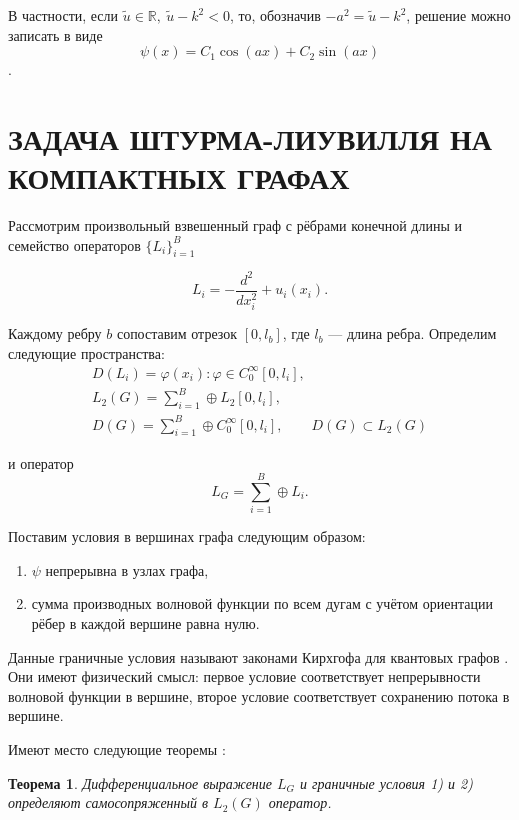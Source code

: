 \documentclass[a4 paper, 12 pt]{extarticle}
\newtheorem{theorem}{Теорема}[section]
\begin{document}
   В частности, если $\tilde{u} \in \mathbb{R}, \ \tilde{u}-k^2<0$, то, обозначив $-a^2=\tilde{u}-k^2$, решение можно записать в виде \[\psi\left(x\right)= C_1 \cos\left(ax\right)+ C_2 \sin\left(ax\right)\].
   
   \section{ЗАДАЧА ШТУРМА-ЛИУВИЛЛЯ НА КОМПАКТНЫХ ГРАФАХ}

   Рассмотрим произвольный взвешенный граф с рёбрами конечной длины и семейство операторов $\{L_i\}_{i=1}^B$

   \begin{equation}\label{LOp}
   L_i = -\frac{d^2}{dx_i^2} + u_i(x_i).
   \end{equation}

   Каждому ребру $b$ сопоставим отрезок $[0, l_b]$, где $l_b$ --- длина ребра.
   Определим следующие пространства:
   \begin{gather*}
   D(L_i)={\varphi(x_i):\varphi\in C_0^\infty[0,l_i]},\\
   L_2(G)=\sum_{i=1}^{B}\oplus L_2[0, l_i],\\
   D(G)=\sum_{i=1}^{B}\oplus C_0^\infty[0,l_i],\qquad D(G)\subset L_2(G)
  \end{gather*}

  и оператор
  \begin{equation}\label{LG}
  L_G=\sum_{i=1}^{B}\oplus L_i.
  \end{equation}

  Поставим условия в вершинах графа следующим образом:

  \begin{enumerate}\label{Kirchoff}
	\item $\psi$ непрерывна в узлах графа,
	\item сумма производных волновой функции по всем дугам с учётом ориентации рёбер в каждой вершине равна нулю.
  \end{enumerate}

  Данные граничные условия называют законами Кирхгофа для квантовых графов \cite{KirchhoffRule}. Они имеют физический смысл: первое условие соответствует непрерывности волновой функции в вершине, второе условие соответствует сохранению потока в вершине.

Имеют место следующие теоремы \cite{GerasimenkoPavlov}:

   \begin{theorem}
	Дифференциальное выражение $L_G$ и граничные условия 1) и 2)
	определяют самосопряженный в $L_2(G)$ оператор.
   \end{theorem}
\end{document}
